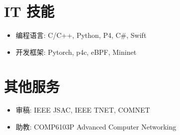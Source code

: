 \documentclass{resume}
\begin{document}
\section{IT 技能}

\begin{itemize}[parsep=0.5ex]
  \item 编程语言: C/C++, Python, P4, C\#, Swift
  \item 开发框架: Pytorch, p4c, eBPF, Mininet
\end{itemize}

\section{其他服务}

\begin{itemize}[parsep=0.5ex]
  \item 审稿: IEEE JSAC, IEEE TNET, COMNET
  \item 助教: COMP6103P Advanced Computer Networking
\end{itemize}
\end{document}
